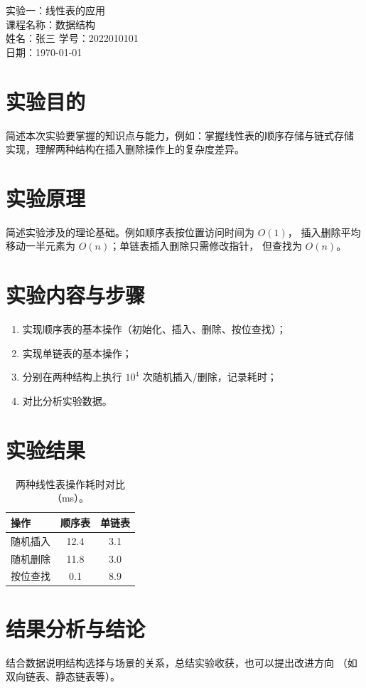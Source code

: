\documentclass[zihao=-4, a4paper]{ctexart}
\newcommand{\coursename}{课程名称：数据结构}
\newcommand{\labtitle}{实验一：线性表的应用}
\newcommand{\studentname}{姓名：张三 \quad 学号：2022010101}
\newcommand{\labdate}{日期：\today}
\begin{document}
\begin{center}
  {\heiti \labtitle}\\[0.6em]
  { \coursename}\\[0.3em]
  { \studentname}\\[0.3em]
  { \labdate}
\end{center}

\section{实验目的}
简述本次实验要掌握的知识点与能力，例如：掌握线性表的顺序存储与链式存储
实现，理解两种结构在插入删除操作上的复杂度差异。

\section{实验原理}
简述实验涉及的理论基础。例如顺序表按位置访问时间为 $O(1)$，
插入删除平均移动一半元素为 $O(n)$；单链表插入删除只需修改指针，
但查找为 $O(n)$。

\section{实验内容与步骤}
\begin{enumerate}
  \item 实现顺序表的基本操作（初始化、插入、删除、按位查找）；
  \item 实现单链表的基本操作；
  \item 分别在两种结构上执行 $10^4$ 次随机插入/删除，记录耗时；
  \item 对比分析实验数据。
\end{enumerate}

\section{实验结果}
\begin{table}[h]
  \centering
  \caption{两种线性表操作耗时对比（ms）。}
  \begin{tabular}{lcc}
    \toprule
    操作 & 顺序表 & 单链表 \\
    \midrule
    随机插入 & 12.4 & 3.1 \\
    随机删除 & 11.8 & 3.0 \\
    按位查找 & 0.1 & 8.9 \\
    \bottomrule
  \end{tabular}
\end{table}

\section{结果分析与结论}
结合数据说明结构选择与场景的关系，总结实验收获，也可以提出改进方向
（如双向链表、静态链表等）。
\end{document}
